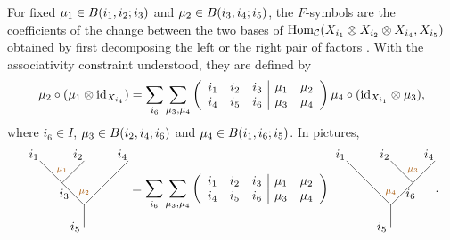 \documentclass{amsart}
\begin{document}
For fixed $\mu_1\in B(i_1,i_2;i_3)$ and $\mu_2\in B(i_3,i_4;i_5)$, the $F$-symbols are the coefficients of the change between the two bases of $\mathrm{Hom}_{\mathcal{C}}(X_{i_1}\otimes X_{i_2}\otimes X_{i_4},X_{i_5})$ obtained by first decomposing the left or the right pair of factors \cite{Bon07,DaHaWa,wang}. With the associativity constraint understood, they are defined by
\[
\mu_2\circ(\mu_1 \otimes \mathrm{id}_{X_{i_4}})
=
\sum_{i_6}\sum_{\mu_3,\mu_4}
\left(
\begin{array}{ccc | cc}
i_1& i_2 & i_3 & \mu_1 & \mu_2 \\
i_4& i_5 & i_6 & \mu_3 & \mu_4
\end{array}
\right)
\mu_4\circ(\mathrm{id}_{X_{i_1}} \otimes \mu_3),
\]
where $i_6\in I$, $\mu_3\in B(i_2,i_4;i_6)$ and $\mu_4\in B(i_1,i_6;i_5)$. In pictures,
\begin{equation} \label{Equ: F-symbols}
\raisebox{-1.25cm}{
\begin{tikzpicture}
\begin{scope}[scale=1.25]
\node[above left,inner sep=.7pt] at (0,0) {$i_1$};
\node[above left,inner sep=.7pt] at (1,0) {$i_2$};
\node[above left,inner sep=.7pt] at (2,0) {$i_4$};
\node at (.75-.2,-.75) {$i_3$};
\node at (1-.2,-1.5) {$i_5$};
\node at (.5,-.5+.29) {\scriptsize $\textcolor{orange!65!black}{\mu_1}$};
\node at (1,-1+.29) {\scriptsize $\textcolor{orange!65!black}{\mu_2}$};
\draw (0,0)--++(1,-1);
\draw (1,0)--++(-.5,-.5);
\draw (2,0)--++(-1,-1)--++(0,-.5);
\end{scope}
\end{tikzpicture}}
=
\sum_{i_6}\sum_{\mu_3,\mu_4}
\left(
\begin{array}{ccc | cc}
i_1& i_2 & i_3 & \mu_1 & \mu_2 \\
i_4& i_5 & i_6 & \mu_3 & \mu_4
\end{array}
\right)
\raisebox{-1.25cm}{
\begin{tikzpicture}
\begin{scope}[scale=1.25]
\node[above left,inner sep=.7pt] at (0,0) {$i_1$};
\node[above left,inner sep=.7pt] at (1,0) {$i_2$};
\node[above left,inner sep=.7pt] at (2,0) {$i_4$};
\node at (1.25+.2,-.75) {$i_6$};
\node at (1-.2,-1.5) {$i_5$};
\node at (1.5,-.5+.29) {\scriptsize $\textcolor{orange!65!black}{\mu_3}$};
\node at (1,-1+.29) {\scriptsize $\textcolor{orange!65!black}{\mu_4}$};
\draw (0,0)--++(1,-1);
\draw (1,0)--++(.5,-.5);
\draw (2,0)--++(-1,-1)--++(0,-.5);
\end{scope}
\end{tikzpicture}}.
\end{equation}
\end{document}
